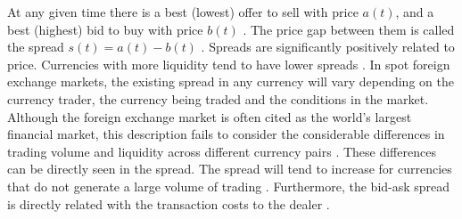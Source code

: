 At any given time there is a best (lowest) offer to sell with price
$a\left(t\right)$, and a best (highest) bid to buy with price $b\left(t\right)$
\cite{subtle_nature,book_forex,prop_order_book,account_spread,limit_ord_spread,stat_theory}.
The price gap between them is called the spread
$s\left(t\right) = a\left(t\right)-b\left(t\right)$
\cite{teach_spread,subtle_nature,Bouchaud_2004,book_forex,account_spread,stat_theory,large_prices_changes,market_digest,em_stylized_facts}.
Spreads are significantly positively related to price. Currencies with more
liquidity tend to have lower spreads
\cite{components_spread_tokyo,account_spread,effects_spread,components_spread}.
In spot foreign exchange markets, the existing spread in any currency will vary
depending on the currency trader, the currency being traded and the conditions
in the market. Although the foreign exchange market is often cited as the
world's largest financial market, this description fails to consider the
considerable differences in trading volume and liquidity across different
currency pairs \cite{forex_microstructure,book_forex_2}. These differences can
be directly seen in the spread. The spread will tend to increase for currencies
that do not generate a large volume of trading \cite{book_forex_2}.
Furthermore, the bid-ask spread is directly related with the transaction costs
to the dealer \cite{teach_spread,spread_futures,book_forex_2}.

